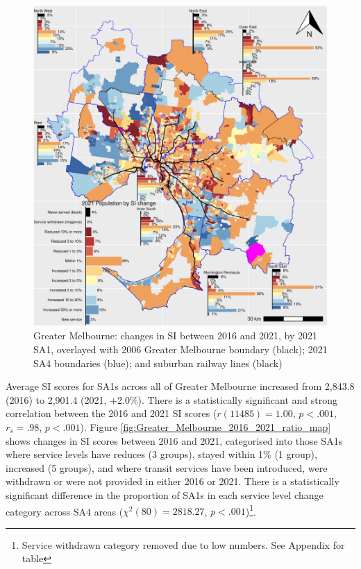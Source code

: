 \documentclass[preprint, 3p,
authoryear]{elsarticle} %
\begin{document}
\begin{figure}
\centering
\includegraphics{ReynoldsCurrieQu2024_files/figure-latex/Greater_Melbourne_2016_2021_ratio_map-1.pdf}
\caption{Greater Melbourne: changes in SI between 2016 and 2021, by 2021
SA1, overlayed with 2006 Greater Melbourne boundary (black); 2021 SA4
boundaries (blue); and suburban railway lines (black)}
\end{figure}

Average SI scores for SA1s across all of Greater Melbourne increased
from 2,843.8 (2016) to 2,901.4 (2021, +2.0\%). There is a statistically
significant and strong correlation between the 2016 and 2021 SI scores
(\(r(11485) = 1.00\), \(p < .001\), \(r_s =.98\), \(p < .001\)). Figure
\ref{fig:Greater_Melbourne_2016_2021_ratio_map} shows changes in SI
scores between 2016 and 2021, categorised into those SA1s where service
levels have reduces (3 groups), stayed within 1\% (1 group), increased
(5 groups), and where transit services have been introduced, were
withdrawn or were not provided in either 2016 or 2021. There is a
statistically significant difference in the proportion of SA1s in each
service level change category across SA4 areas
(\(\chi^2(80) = 2818.27\), \(p < .001\))\footnote{Service withdrawn
  category removed due to low numbers. See Appendix for table}.
\end{document}

